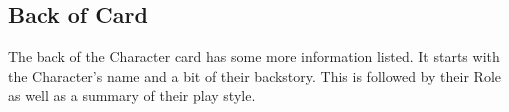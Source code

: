 \documentclass[../main.tex]{subfiles}
\begin{document}
\subsection{Back of Card}
    \normalsize The back of the Character card has some more information listed. It starts with the Character's name and a bit of their backstory. This is followed by their Role as well as a summary of their play style. 
  
\clearpage
\end{document}

